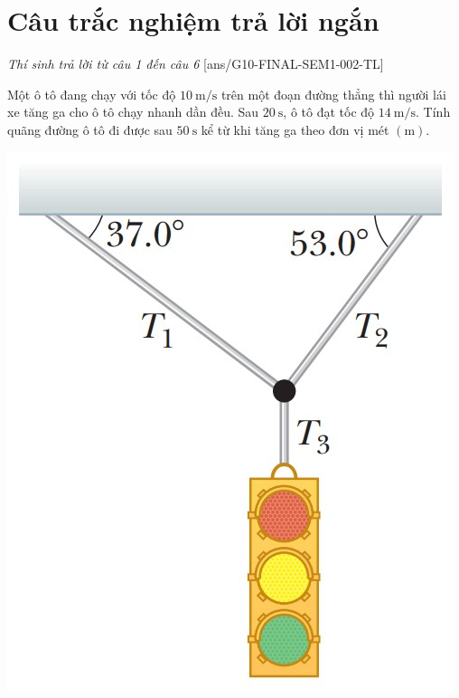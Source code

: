 \section{Câu trắc nghiệm trả lời ngắn} \textit{Thí sinh trả lời từ câu 1 đến câu 6}
\setcounter{ex}{0}
[ans/G10-FINAL-SEM1-002-TL]
\begin{ex}
	Một ô tô đang chạy với tốc độ $\SI{10}{\meter/\second}$ trên một đoạn đường thẳng thì người lái xe tăng ga cho ô tô chạy nhanh dần đều. Sau $\SI{20}{\second}$, ô tô đạt tốc độ $\SI{14}{\meter/\second}$. Tính quãng đường ô tô đi được sau $\SI{50}{\second}$ kể từ khi tăng ga theo đơn vị mét $\left(\si{\meter}\right)$.	
	\loigiai{
		
	}
\end{ex}
\begin{ex}
	{\vspace{-0.5cm}
		\includegraphics[scale=0.3]{../figs//D10-CK1-002-4}}
	\loigiai{
		
	}
\end{ex}
